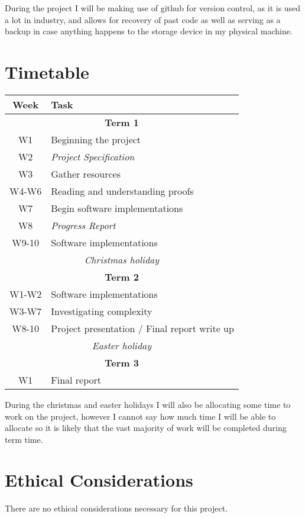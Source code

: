 \documentclass[12pt, a4paper]{article}
\begin{document}
During the project I will be making use of github for version control, as it is used a lot in industry, and allows for recovery of past code as well as serving as a backup in case anything happens to the storage device in my physical machine.

\section{Timetable}

\begin{center}
    \begin{tabular}{| c | p{8cm} |}
        \hline
        \textbf{Week} & \textbf{Task} \\
        \hline
        \multicolumn{2}{|c|}{\textbf{Term 1}} \\
        \hline
        W1 & Beginning the project \\
        W2 & \textit{Project Specification} \\
        W3 & Gather resources \\
        W4-W6 & Reading and understanding proofs \\
        W7 & Begin software implementations \\
        W8 & \textit{Progress Report} \\
        W9-10 & Software implementations \\
        \hline
        \multicolumn{2}{|c|}{\textit{Christmas holiday}}\\
        \hline
        \multicolumn{2}{|c|}{\textbf{Term 2}} \\
        \hline
        W1-W2 & Software implementations \\
        W3-W7 & Investigating complexity \\
        W8-10 & Project presentation / Final report write up \\
        \hline
        \multicolumn{2}{|c|}{\textit{Easter holiday}}\\
        \hline
        \multicolumn{2}{|c|}{\textbf{Term 3}}\\
        \hline
        W1 & Final report\\
        \hline
    \end{tabular}
\end{center}
During the christmas and easter holidays I will also be allocating some time to work on the project, however I cannot say how much time I will be able to allocate so it is likely that the vast majority of work will be completed during term time.

\section{Ethical Considerations}
There are no ethical considerations necessary for this project.
\end{document}
